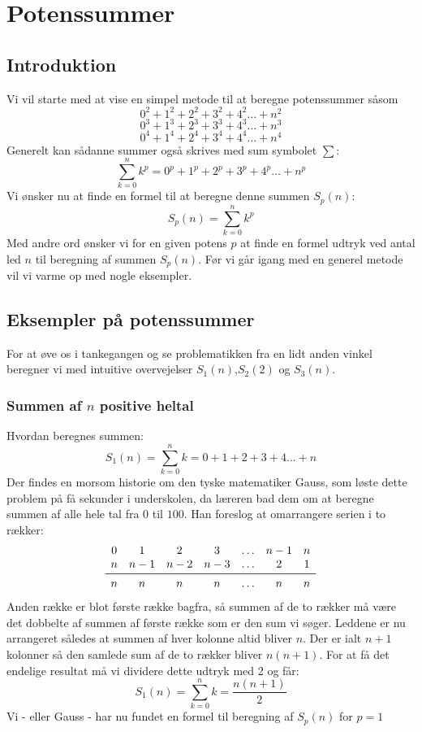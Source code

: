 \chapter{Potenssummer}

\section{Introduktion}
Vi vil starte med at vise en simpel metode til at beregne potenssummer såsom
\[0^2+1^2+2^2+3^2+4^2 \ldots +n^2 \]
\[0^3+1^3+2^3+3^3+4^3 \ldots +n^3 \]
\[0^4+1^4+2^4+3^4+4^4 \ldots +n^4 \]
Generelt kan sådanne summer også skrives med sum symbolet \(\sum\):
\[\sum_{k=0}^{n}k^p=0^p+1^p+2^p+3^p+4^p \ldots +n^p\]
Vi ønsker nu at finde en formel til at beregne denne summen \(S_p(n)\):
\[S_p(n)=\sum_{k=0}^{n}k^p\]
Med andre ord ønsker vi for en given potens \(p\) at finde en formel udtryk ved antal led \(n\) til beregning af summen \(S_p(n)\). Før vi går igang med en generel metode vil vi varme op med nogle eksempler.
\section{Eksempler på potenssummer}
For at øve os i tankegangen og se problematikken fra en lidt anden vinkel beregner vi med intuitive overvejelser \(S_1(n)\),\( S_2(2)\) og \(S_3(n)\).

\subsection{Summen af \(n\) positive heltal}
Hvordan beregnes summen:
\[S_1(n)=\sum_{k=0}^{n}k=0+1+2+3+4 \ldots +n\] 
Der findes en morsom historie om den tyske matematiker Gauss, som løste dette problem på få sekunder i underskolen, da læreren bad dem om at beregne summen af alle hele tal fra \(0\) til \(100\). Han foreslog at omarrangere serien i to rækker:\\
\begin{equation*}
\begin{array}{ccccccc}
0&1&2&3&\ldots&n-1&n\\
n&n-1&n-2&n-3&\ldots&2&1\\
\midrule
n&n&n&n&\ldots&n&n
\end{array}
\end{equation*}
Anden række er blot første række bagfra, så summen af de to rækker må være det dobbelte af summen af første række som er den sum vi søger. Leddene er nu arrangeret således at summen af hver kolonne altid bliver \(n\). Der er ialt \(n+1\) kolonner så den samlede sum af de to rækker bliver \(n(n+1)\). For at få det endelige resultat må vi dividere dette udtryk med 2 og får:
\begin{equation}
S_1(n)=\sum_{k=0}^{n}k=\frac{n(n+1)}{2}\label{gauss}
\end{equation}
Vi - eller Gauss - har nu fundet en formel til beregning af \(S_p(n)\) for \(p=1\) 
